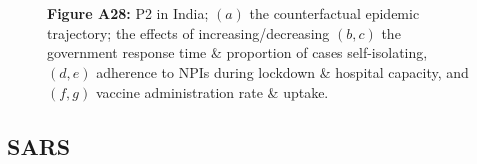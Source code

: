 \documentclass[paper=a4,fontsize=11pt]{article}
\begin{document}
\begin{figure}[!h]
  \\
  \hspace{1.76cm}
  \\
  \caption*{\textbf{Figure A28:} P2 in India; $(a)$ the counterfactual epidemic trajectory; the effects of increasing/decreasing $(b,c)$ the government response time \& proportion of cases self-isolating, $(d,e)$ adherence to NPIs during lockdown \& hospital capacity, and $(f,g)$ vaccine administration rate \& uptake.}
\end{figure}


\subsection{SARS}
\end{document}
